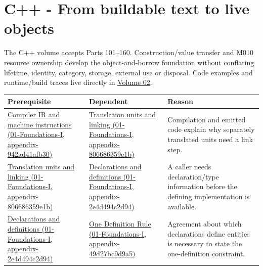 \section{C++ - From buildable text to live objects}\label{appendix-4ad47bdd269a-c---from-buildable-text-to-live-objects}

The C++ volume accepts Parts 101--160. Construction/value transfer and M010 resource ownership develop the object-and-borrow foundation without conflating lifetime, identity, category, storage, external use or disposal. Code examples and runtime/build traces live directly in \href{Continuous\%20Notes/Computing\%20Foundations\%20-\%20From\%20Bits\%20to\%20C++\%20and\%20Systems\%20APIs}{Volume 02}.

{\def\LTcaptype{none} %
\begin{longtable}[]{@{}
  >{\raggedright\arraybackslash}p{}
  >{\raggedright\arraybackslash}p{}
  >{\raggedright\arraybackslash}p{}@{}}
\toprule\noalign{}
\begin{minipage}[b]{\linewidth}\raggedright
Prerequisite
\end{minipage} & \begin{minipage}[b]{\linewidth}\raggedright
Dependent
\end{minipage} & \begin{minipage}[b]{\linewidth}\raggedright
Reason
\end{minipage} \\
\midrule\noalign{}
\endhead
\bottomrule\noalign{}
\endlastfoot
\href{../01-Foundations-I/main.pdf\#nameddest=appendix-942ad41afb30}{Compiler IR and machine instructions (01-Foundations-I, appendix-942ad41afb30)} & \href{../01-Foundations-I/main.pdf\#nameddest=appendix-806686359e1b}{Translation units and linking (01-Foundations-I, appendix-806686359e1b)} & Compilation and emitted code explain why separately translated units need a link step. \\
\href{../01-Foundations-I/main.pdf\#nameddest=appendix-806686359e1b}{Translation units and linking (01-Foundations-I, appendix-806686359e1b)} & \href{../01-Foundations-I/main.pdf\#nameddest=appendix-2e4d494c2d94}{Declarations and definitions (01-Foundations-I, appendix-2e4d494c2d94)} & A caller needs declaration/type information before the defining implementation is available. \\
\href{../01-Foundations-I/main.pdf\#nameddest=appendix-2e4d494c2d94}{Declarations and definitions (01-Foundations-I, appendix-2e4d494c2d94)} & \href{../01-Foundations-I/main.pdf\#nameddest=appendix-49d27bc9d9a5}{One Definition Rule (01-Foundations-I, appendix-49d27bc9d9a5)} & Agreement about which declarations define entities is necessary to state the one-definition constraint. \\

\end{longtable}}
